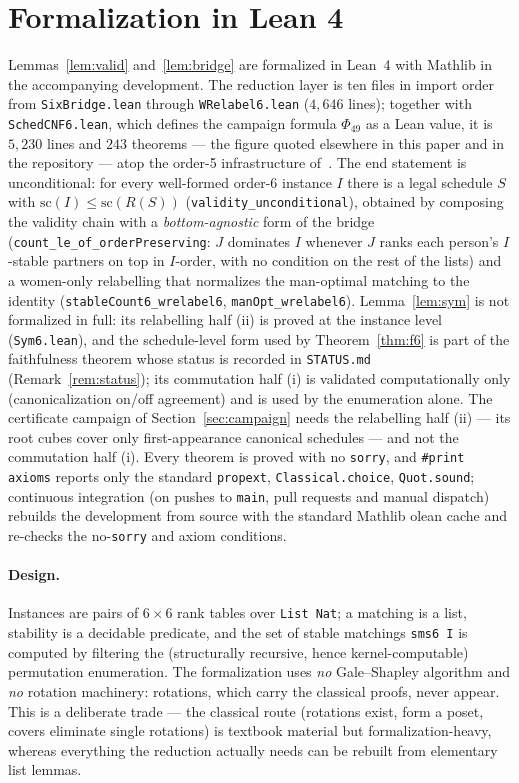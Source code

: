 \documentclass[11pt]{article}
\begin{document}
\section{Formalization in Lean 4}\label{sec:lean}

Lemmas~\ref{lem:valid} and~\ref{lem:bridge} are formalized in Lean~4 with Mathlib in
the accompanying development. The reduction layer is ten files in import order from
\texttt{SixBridge.lean} through \texttt{WRelabel6.lean} ($4{,}646$ lines); together with
\texttt{SchedCNF6.lean}, which defines the campaign formula $\Phi_{49}$ as a Lean value, it is
$5{,}230$ lines and $243$ theorems --- the figure quoted elsewhere in this paper and in the
repository --- atop the order-5 infrastructure of~\cite{f5paper}. The end statement is
unconditional: for every well-formed order-6
instance $I$ there is a legal schedule $S$ with $\mathrm{sc}(I)\le\mathrm{sc}(R(S))$
(\texttt{validity\_unconditional}), obtained by composing the validity chain with a
\emph{bottom-agnostic} form of the bridge (\texttt{count\_le\_of\_orderPreserving}:
$J$ dominates $I$ whenever $J$ ranks each person's $I$-stable partners on top in
$I$-order, with no condition on the rest of the lists) and a women-only relabelling that
normalizes the man-optimal matching to the identity
(\texttt{stableCount6\_wrelabel6}, \texttt{manOpt\_wrelabel6}). Lemma~\ref{lem:sym}
is not formalized in full: its relabelling half (ii) is proved at the instance level
(\texttt{Sym6.lean}), and the schedule-level form used by Theorem~\ref{thm:f6} is part of the
faithfulness theorem whose status is recorded in \texttt{STATUS.md} (Remark~\ref{rem:status});
its commutation half (i) is validated computationally only (canonicalization on/off agreement) and
is used by the enumeration alone. The certificate campaign of Section~\ref{sec:campaign} needs
the relabelling half (ii) --- its root cubes cover only first-appearance canonical schedules ---
and not the commutation half (i). Every theorem is proved with no \texttt{sorry}, and
\texttt{\#print axioms} reports only the standard \texttt{propext}, \texttt{Classical.choice},
\texttt{Quot.sound}; continuous integration (on pushes to \texttt{main}, pull requests and manual
dispatch) rebuilds the development from source with the standard Mathlib olean cache and re-checks
the no-\texttt{sorry} and axiom conditions.

\paragraph{Design.} Instances are pairs of $6\times 6$ rank tables over
\texttt{List Nat}; a matching is a list, stability is a decidable predicate, and the
set of stable matchings \texttt{sms6 I} is computed by filtering the (structurally
recursive, hence kernel-computable) permutation enumeration. The formalization uses
\emph{no} Gale--Shapley algorithm and \emph{no} rotation machinery: rotations, which
carry the classical proofs, never appear. This is a deliberate trade --- the
classical route (rotations exist, form a poset, covers eliminate single rotations)
is textbook material but formalization-heavy, whereas everything the reduction
actually needs can be rebuilt from elementary list lemmas.
\end{document}
